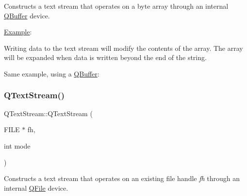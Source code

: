 Constructs a text stream that operates on a byte array through an internal \mbox{\hyperlink{class_q_buffer}{Q\+Buffer}} device.

\mbox{\hyperlink{struct_example}{Example}}\+: 
\begin{DoxyCode}{0}
\end{DoxyCode}


Writing data to the text stream will modify the contents of the array. The array will be expanded when data is written beyond the end of the string.

Same example, using a \mbox{\hyperlink{class_q_buffer}{Q\+Buffer}}\+: 
\begin{DoxyCode}{0}
\end{DoxyCode}
 \mbox{\label{class_q_text_stream_a53439eda88c78b200b675b7909343b10}} 
\subsubsection{\texorpdfstring{QTextStream()}{QTextStream()}\hspace{0.1cm}{\footnotesize\ttfamily [6/6]}}
{\footnotesize\ttfamily Q\+Text\+Stream\+::\+Q\+Text\+Stream (\begin{DoxyParamCaption}\item[{F\+I\+LE $\ast$}]{fh,  }\item[{int}]{mode }\end{DoxyParamCaption})}

Constructs a text stream that operates on an existing file handle {\itshape fh} through an internal \mbox{\hyperlink{class_q_file}{Q\+File}} device.

